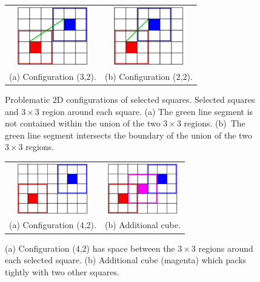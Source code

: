 \begin{figure}[t]
\centering
\begin{tabular}{cc}
\includegraphics[width=1.2in]{images/config2D_3_2.eps} \qquad &
\qquad
\includegraphics[width=1.2in]{images/config2D_2_2.eps} \\
(a) Configuration (3,2). & (b) Configuration (2,2). 
\end{tabular}
\caption{Problematic 2D configurations of selected squares.
Selected squares and $3 \times 3$ region around each square.
(a) The green line segment is not contained within the union
of the two $3 \times 3$ regions.
(b)~The green line segment intersects the boundary
of the union of the two $3 \times 3$ regions.}
\label{fig:loose2D}
\end{figure}

\begin{figure}[t]
\centering
\begin{tabular}{cc}
\includegraphics[width=1.2in]{images/config2D_4_2.eps} \qquad &
\qquad
\includegraphics[width=1.2in]{images/config2D_4_2_B.eps} \\
(a) Configuration (4,2). & (b) Additional cube.
\end{tabular}
\caption{(a) Configuration (4,2) has space between the $3 \times 3$
regions around each selected square.
(b) Additional cube (magenta) which packs tightly with two other squares.}
\label{fig:config2D_4_2}
\end{figure}

